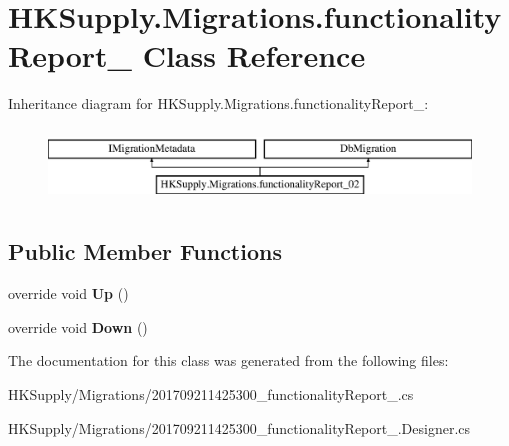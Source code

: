 \hypertarget{class_h_k_supply_1_1_migrations_1_1functionality_report__02}{}\section{H\+K\+Supply.\+Migrations.\+functionality\+Report\+\_ Class Reference}
\label{class_h_k_supply_1_1_migrations_1_1functionality_report__02}
Inheritance diagram for H\+K\+Supply.\+Migrations.\+functionality\+Report\+\_\+:\begin{figure}[H]
\begin{center}
\leavevmode
\includegraphics[height=2.000000cm]{class_h_k_supply_1_1_migrations_1_1functionality_report__02}
\end{center}
\end{figure}
\subsection*{Public Member Functions}
\begin{DoxyCompactItemize}
\item 
\mbox{\label{class_h_k_supply_1_1_migrations_1_1functionality_report__02_a511e286958e40237cdbbf7fd7d44c8d3}} 
override void {\bfseries Up} ()
\item 
\mbox{\label{class_h_k_supply_1_1_migrations_1_1functionality_report__02_a94b8ae004ba9d6d428081b8033e70027}} 
override void {\bfseries Down} ()
\end{DoxyCompactItemize}


The documentation for this class was generated from the following files\+:\begin{DoxyCompactItemize}
\item 
H\+K\+Supply/\+Migrations/201709211425300\+\_\+functionality\+Report\+\_.\+cs\item 
H\+K\+Supply/\+Migrations/201709211425300\+\_\+functionality\+Report\+\_.\+Designer.\+cs\end{DoxyCompactItemize}
